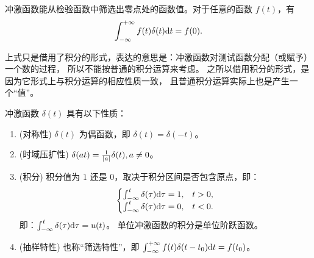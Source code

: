 \begin{property}[从函数到值的映射关系]
    冲激函数能从检验函数中筛选出零点处的函数值。对于任意的函数 $f(t)$，有
    \begin{align*}
        \int_{-\infty}^{+\infty}f(t)\delta(t)\mathrm{d}t = f(0).
    \end{align*}

    上式只是借用了积分的形式，表达的意思是：冲激函数对测试函数分配（或赋予）一个数的过程，
    所以不能按普通的积分运算来考虑。
    之所以借用积分的形式，是因为它形式上与积分运算的相应性质一致，
    且普通积分运算实际上也是产生一个``值''。
\end{property}

\begin{property}[冲激函数的性质总结]
    冲激函数 $\delta(t)$ 具有以下性质：
    \begin{enumerate}
        \item (对称性) $\delta(t)$ 为偶函数，即 $\delta(t) = \delta(-t)$。
        \item (时域压扩性) $\delta(at) = \frac{1}{\left|a\right|}\delta(t), a \neq 0$。
        \item (积分) 积分值为 $1$ 还是 $0$，取决于积分区间是否包含原点，即：
            \begin{align*}
                \begin{cases}
                    \int_{-\infty}^{t}\delta(\tau)\mathrm{d}\tau = 1, & t > 0, \\
                    \int_{-\infty}^{t}\delta(\tau)\mathrm{d}\tau = 0, & t < 0.
                \end{cases}
            \end{align*}
            即：$\int_{-\infty}^{t}\delta(\tau)\mathrm{d}\tau = u(t)$。
            单位冲激函数的积分是单位阶跃函数。
        \item (抽样特性) 也称``筛选特性''，即 $\int_{-\infty}^{+\infty}f(t)\delta(t - t_0)\mathrm{d}t = f(t_0)$。
    \end{enumerate}
\end{property}


